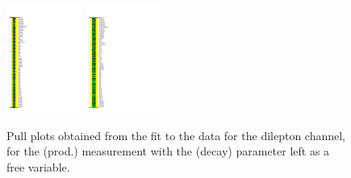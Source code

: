 \begin{figure}[ht]
  \centering
  \includegraphics[width=0.22\textwidth]{figures/diff_xsec/dilep_tty_prod_mu_blinded/compare_NP_pulls/compare_NP_dilep_fits_pt_ptj1_ptll/NuisPar_comp.pdf}
  \quad \quad
  \includegraphics[width=0.22\textwidth]{figures/diff_xsec/dilep_tty_prod_mu_blinded/compare_NP_pulls/compare_NP_dilep_fits_dr_dr1_dr2/NuisPar_comp.pdf}
  \caption{Pull plots obtained from the fit to the data for the dilepton channel, for the \tty (prod.) measurement
  with the \tty (decay) parameter left as a free variable.}
  \label{fig:pull_plot_pt_tty_dec_free_dilep_mu_blinded_1}
\end{figure}
\FloatBarrier

